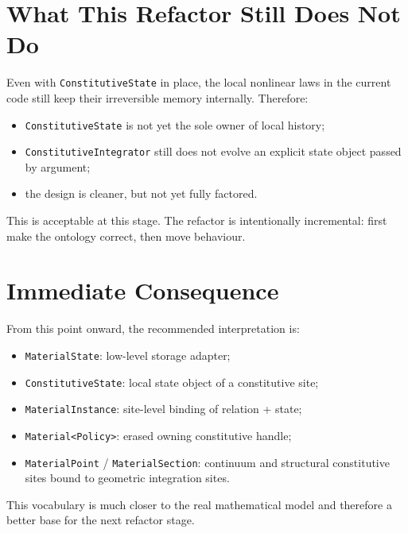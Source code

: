 \section{What This Refactor Still Does Not Do}

Even with \texttt{ConstitutiveState} in place, the local nonlinear laws in the
current code still keep their irreversible memory internally.  Therefore:

\begin{itemize}
  \item \texttt{ConstitutiveState} is not yet the sole owner of local history;
  \item \texttt{ConstitutiveIntegrator} still does not evolve an explicit state
        object passed by argument;
  \item the design is cleaner, but not yet fully factored.
\end{itemize}

This is acceptable at this stage.  The refactor is intentionally incremental:
first make the ontology correct, then move behaviour.

\section{Immediate Consequence}

From this point onward, the recommended interpretation is:

\begin{itemize}
  \item \texttt{MaterialState}: low-level storage adapter;
  \item \texttt{ConstitutiveState}: local state object of a constitutive site;
  \item \texttt{MaterialInstance}: site-level binding of relation + state;
  \item \texttt{Material<Policy>}: erased owning constitutive handle;
  \item \texttt{MaterialPoint} / \texttt{MaterialSection}: continuum and
        structural constitutive sites bound to geometric integration sites.
\end{itemize}

This vocabulary is much closer to the real mathematical model and therefore a
better base for the next refactor stage.

